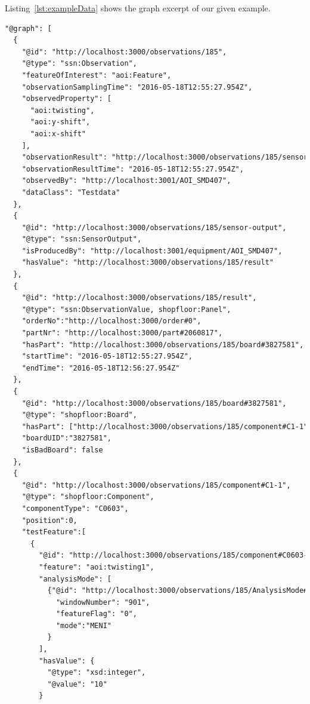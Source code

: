 Listing~\ref{lst:exampleData} shows the graph excerpt of our given example.

\begin{lstlisting}[language={XML},label={lst:exampleData},caption={An excerpt showing the observation of components.},captionpos=b]
"@graph": [
  {
    "@id": "http://localhost:3000/observations/185",
    "@type": "ssn:Observation",
    "featureOfInterest": "aoi:Feature",
    "observationSamplingTime": "2016-05-18T12:55:27.954Z",
    "observedProperty": [
      "aoi:twisting",
      "aoi:y-shift",
      "aoi:x-shift"
    ],
    "observationResult": "http://localhost:3000/observations/185/sensor-output",
    "observationResultTime": "2016-05-18T12:55:27.954Z",
    "observedBy": "http://localhost:3001/AOI_SMD407",
    "dataClass": "Testdata"
  },
  {
    "@id": "http://localhost:3000/observations/185/sensor-output",
    "@type": "ssn:SensorOutput",
    "isProducedBy": "http://localhost:3001/equipment/AOI_SMD407",
    "hasValue": "http://localhost:3000/observations/185/result"
  },
  {
    "@id": "http://localhost:3000/observations/185/result",
    "@type": "ssn:ObservationValue, shopfloor:Panel",
    "orderNo":"http://localhost:3000/order#0",
    "partNr": "http://localhost:3000/part#2060817",
    "hasPart": "http://localhost:3000/observations/185/board#3827581",
    "startTime": "2016-05-18T12:55:27.954Z",
    "endTime": "2016-05-18T12:56:27.954Z"
  },
  {
    "@id": "http://localhost:3000/observations/185/board#3827581",
    "@type": "shopfloor:Board",
    "hasPart": ["http://localhost:3000/observations/185/component#C1-1","http://localhost:3000/observations/185/component#C2-1"],
    "boardUID":"3827581",
    "isBadBoard": false
  },
  {
    "@id": "http://localhost:3000/observations/185/component#C1-1",
    "@type": "shopfloor:Component",
    "componentType": "C0603",
    "position":0,
    "testFeature":[
      {
        "@id": "http://localhost:3000/observations/185/component#C0603-MENI-901-TWISTING",
        "feature": "aoi:twisting1",
        "analysisMode": [
          {"@id": "http://localhost:3000/observations/185/AnalysisMode#C0603-MENI-901-TWISTING",
            "windowNumber": "901",
            "featureFlag": "0",
            "mode":"MENI"
          }
        ],
        "hasValue": {
          "@type": "xsd:integer",
          "@value": "10"
        }


\end{lstlisting}
